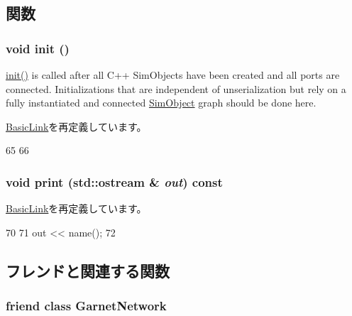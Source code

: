 \subsection{関数}
\hypertarget{classGarnetExtLink_a02fd73d861ef2e4aabb38c0c9ff82947}{
\subsubsection[{init}]{\setlength{\rightskip}{0pt plus 5cm}void init ()}}
\label{classGarnetExtLink_a02fd73d861ef2e4aabb38c0c9ff82947}
\hyperlink{classGarnetExtLink_a02fd73d861ef2e4aabb38c0c9ff82947}{init()} is called after all C++ SimObjects have been created and all ports are connected. Initializations that are independent of unserialization but rely on a fully instantiated and connected \hyperlink{classSimObject}{SimObject} graph should be done here. 

\hyperlink{classBasicLink_a02fd73d861ef2e4aabb38c0c9ff82947}{BasicLink}を再定義しています。


\begin{DoxyCode}
65 {
66 }
\end{DoxyCode}
\hypertarget{classGarnetExtLink_ac55fe386a101fbae38c716067c9966a0}{
\subsubsection[{print}]{\setlength{\rightskip}{0pt plus 5cm}void print (std::ostream \& {\em out}) const}}
\label{classGarnetExtLink_ac55fe386a101fbae38c716067c9966a0}


\hyperlink{classBasicLink_ac55fe386a101fbae38c716067c9966a0}{BasicLink}を再定義しています。


\begin{DoxyCode}
70 {
71     out << name();
72 }
\end{DoxyCode}


\subsection{フレンドと関連する関数}
\hypertarget{classGarnetExtLink_a93e18c390666ec9c26269c22345e9e94}{
\subsubsection[{GarnetNetwork}]{\setlength{\rightskip}{0pt plus 5cm}friend class {\bf GarnetNetwork}}}
\label{classGarnetExtLink_a93e18c390666ec9c26269c22345e9e94}


